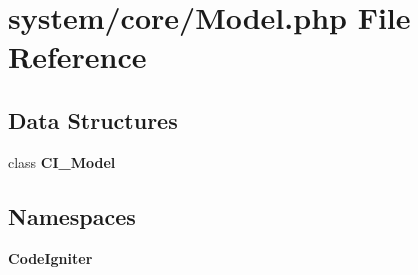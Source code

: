 \section{system/core/\-Model.php File Reference}
\label{_model_8php}
\subsection*{Data Structures}
\begin{DoxyCompactItemize}
\item 
class {\bf C\-I\-\_\-\-Model}
\end{DoxyCompactItemize}
\subsection*{Namespaces}
\begin{DoxyCompactItemize}
\item 
{\bf Code\-Igniter}
\end{DoxyCompactItemize}
